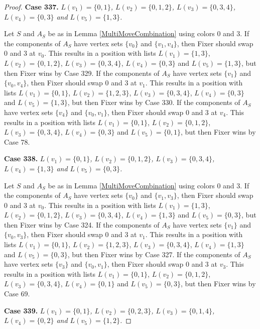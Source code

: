 \documentclass[12pt]{amsart}
\theoremstyle{plain}
\theoremstyle{definition}
\theoremstyle{remark}
\begin{document}
\begin{proof}
\noindent\textbf{Case 337.  }\textit{$L(v_1) = \{0, 1\}$, $L(v_2) = \{0, 1, 2\}$, $L(v_3) = \{0, 3, 4\}$, $L(v_4) = \{0, 3\}$ and $L(v_5) = \{1, 3\}$.}

Let $S$ and $A_S$ be as in Lemma \ref{MultiMoveCombination} using colors $0$ and $3$. If the components of $A_S$ have vertex sets $\{v_0\}$ and $\{v_1, v_4\}$, then Fixer should swap 0 and 3 at $v_0$. This results in a position with lists $L(v_1) = \{1, 3\}$, $L(v_2) = \{0, 1, 2\}$, $L(v_3) = \{0, 3, 4\}$, $L(v_4) = \{0, 3\}$ and $L(v_5) = \{1, 3\}$, but then Fixer wins by Case 329. If the components of $A_S$ have vertex sets $\{v_1\}$ and $\{v_0, v_4\}$, then Fixer should swap 0 and 3 at $v_1$. This results in a position with lists $L(v_1) = \{0, 1\}$, $L(v_2) = \{1, 2, 3\}$, $L(v_3) = \{0, 3, 4\}$, $L(v_4) = \{0, 3\}$ and $L(v_5) = \{1, 3\}$, but then Fixer wins by Case 330. If the components of $A_S$ have vertex sets $\{v_4\}$ and $\{v_0, v_1\}$, then Fixer should swap 0 and 3 at $v_4$. This results in a position with lists $L(v_1) = \{0, 1\}$, $L(v_2) = \{0, 1, 2\}$, $L(v_3) = \{0, 3, 4\}$, $L(v_4) = \{0, 3\}$ and $L(v_5) = \{0, 1\}$, but then Fixer wins by Case 78. 

\noindent\textbf{Case 338.  }\textit{$L(v_1) = \{0, 1\}$, $L(v_2) = \{0, 1, 2\}$, $L(v_3) = \{0, 3, 4\}$, $L(v_4) = \{1, 3\}$ and $L(v_5) = \{0, 3\}$.}

Let $S$ and $A_S$ be as in Lemma \ref{MultiMoveCombination} using colors $0$ and $3$. If the components of $A_S$ have vertex sets $\{v_0\}$ and $\{v_1, v_3\}$, then Fixer should swap 0 and 3 at $v_0$. This results in a position with lists $L(v_1) = \{1, 3\}$, $L(v_2) = \{0, 1, 2\}$, $L(v_3) = \{0, 3, 4\}$, $L(v_4) = \{1, 3\}$ and $L(v_5) = \{0, 3\}$, but then Fixer wins by Case 324. If the components of $A_S$ have vertex sets $\{v_1\}$ and $\{v_0, v_3\}$, then Fixer should swap 0 and 3 at $v_1$. This results in a position with lists $L(v_1) = \{0, 1\}$, $L(v_2) = \{1, 2, 3\}$, $L(v_3) = \{0, 3, 4\}$, $L(v_4) = \{1, 3\}$ and $L(v_5) = \{0, 3\}$, but then Fixer wins by Case 327. If the components of $A_S$ have vertex sets $\{v_3\}$ and $\{v_0, v_1\}$, then Fixer should swap 0 and 3 at $v_3$. This results in a position with lists $L(v_1) = \{0, 1\}$, $L(v_2) = \{0, 1, 2\}$, $L(v_3) = \{0, 3, 4\}$, $L(v_4) = \{0, 1\}$ and $L(v_5) = \{0, 3\}$, but then Fixer wins by Case 69. 

\noindent\textbf{Case 339.  }\textit{$L(v_1) = \{0, 1\}$, $L(v_2) = \{0, 2, 3\}$, $L(v_3) = \{0, 1, 4\}$, $L(v_4) = \{0, 2\}$ and $L(v_5) = \{1, 2\}$.}


\end{proof}
\end{document}
